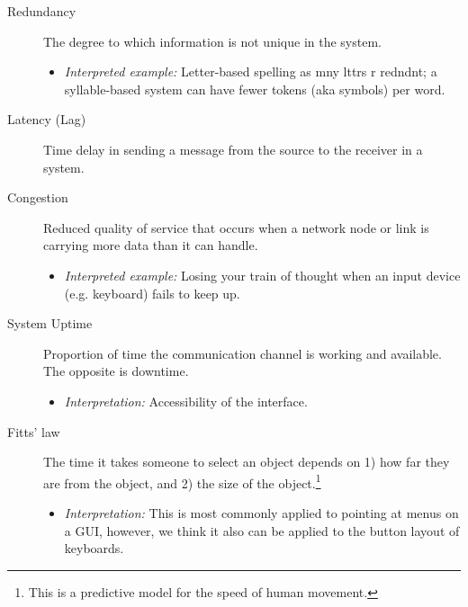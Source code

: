 \documentclass[logo,bsc,singlespacing,parskip]{infthesis}
\begin{document}
{\begin{mdframed}
\begin{description}
\item[{Redundancy}] The degree to which information is not unique in the system.
\begin{itemize}
\item \emph{Interpreted example:} Letter-based spelling as mny lttrs r redndnt; a syllable-based system can have fewer tokens (aka symbols) per word.
\end{itemize}
\end{description}
\end{mdframed}

\begin{mdframed}
\begin{description}
\item[{Latency (Lag)}] Time delay in sending a message from the source to the receiver in a system.
\end{description}
\end{mdframed}

\begin{mdframed}
\begin{description}
\item[{\label{org99cfbfd}Congestion}] Reduced quality of service that occurs when a network node or link is carrying more data than it can handle.
\begin{itemize}
\item \emph{Interpreted example:} Losing your train of thought when an input device (e.g. keyboard) fails to keep up.
\end{itemize}
\end{description}
\end{mdframed}

\begin{mdframed}
\begin{description}
\item[{\label{org1125b77}System Uptime}] Proportion of time the communication channel is working and available. 
The opposite is downtime.
\begin{itemize}
\item \emph{Interpretation:} Accessibility of the interface.
\end{itemize}
\end{description}
\end{mdframed}

\begin{mdframed}
\begin{description}
\item[{Fitts' law}] The time it takes someone to select an object depends on 1) how far they are from the object, and 2) the size of the object.\footnote{This is a predictive model for the speed of human movement.}
\begin{itemize}
\item \emph{Interpretation:} This is most commonly applied to pointing at menus on a GUI, however, we think it also can be applied to the button layout of keyboards.
\end{itemize}
\end{description}
\end{mdframed}

}
\end{document}
